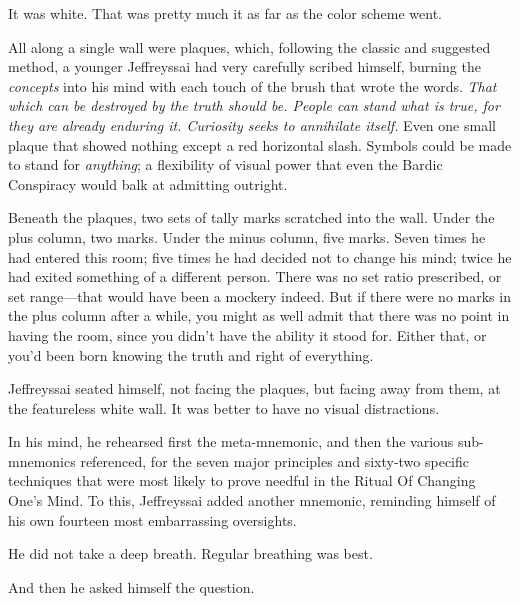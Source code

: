{
 It was white. That was pretty much it as far as the color scheme
went.}

{
 All along a single wall were plaques, which, following the classic
and suggested method, a younger Jeffreyssai had very carefully scribed
himself, burning the \textit{concepts} into his mind with each touch of
the brush that wrote the words. \textit{That which can be destroyed by
the truth should be. People can stand what is true, for they are
already enduring it. Curiosity seeks to annihilate itself.} Even one
small plaque that showed nothing except a red horizontal slash. Symbols
could be made to stand for \textit{anything}; a flexibility of visual
power that even the Bardic Conspiracy would balk at admitting
outright.}

{
 Beneath the plaques, two sets of tally marks scratched into the
wall. Under the plus column, two marks. Under the minus column, five
marks. Seven times he had entered this room; five times he had decided
not to change his mind; twice he had exited something of a different
person. There was no set ratio prescribed, or set range---that would
have been a mockery indeed. But if there were no marks in the plus
column after a while, you might as well admit that there was no point
in having the room, since you didn't have the ability
it stood for. Either that, or you'd been born knowing
the truth and right of everything.}

{
 Jeffreyssai seated himself, not facing the plaques, but facing
away from them, at the featureless white wall. It was better to have no
visual distractions.}

{
 In his mind, he rehearsed first the meta-mnemonic, and then the
various sub-mnemonics referenced, for the seven major principles and
sixty-two specific techniques that were most likely to prove needful in
the Ritual Of Changing One's Mind. To this, Jeffreyssai
added another mnemonic, reminding himself of his own fourteen most
embarrassing oversights.}

{
 He did not take a deep breath. Regular breathing was best.}

{
 And then he asked himself the question.}

\myendsectiontext



